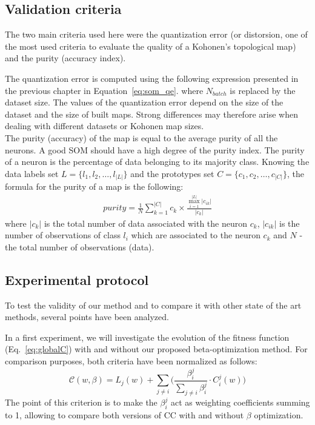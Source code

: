 \subsection{Validation criteria}
The two main criteria used here were the quantization error (or distorsion, one of the most used criteria to evaluate the quality of a Kohonen's topological map) and the purity (accuracy index).

The quantization error is computed using the following expression presented in the previous chapter in Equation~\ref{eq:som_qe}.
where $N_{batch}$ is replaced by the dataset size. The values of the quantization error depend on the size of the dataset and the size of built maps. Strong differences may therefore arise when dealing with different datasets or Kohonen map sizes.\\

The purity (accuracy) of the map is equal to the average purity of all the neurons.
A good SOM should have a high degree of the purity index.
The purity of a neuron is the percentage of data belonging to its majority class.
Knowing the data labels set $L = \{l_{1}, l_{2}, \ldots,  l_{|L|}\}$ and the prototypes set
$C = \{c_{1}, c_{2}, \ldots, c_{|C|}\}$, the formula for the purity of a map is the following:\\

\begin{eqnarray}
purity = \frac{1}{N} \sum_{k=1}^{|C|} c_{k}\times \frac{\max_{i=1}^{|L|}|c_{ik}|}{|c_{k}|}
\end{eqnarray}
where $|c_k|$ is the total number of data associated with the neuron $c_k$, $|c_{ik}| $ is the number of observations
of class $l_{i}$ which are associated to the neuron $c_{k}$ and $N$ - the total number of observations (data).\\%



\subsection{Experimental protocol}
To test the validity of our method and to compare it with other state of the art methods, several points have been analyzed. 

In a first experiment, we will investigate the evolution of the fitness function (Eq.~\ref{eq:globalC}) with and without our proposed beta-optimization method. For comparison purposes, both criteria have been normalized as follows: 
\begin{equation}
\mathcal{C}(w,\beta) = L_j(w) +
\sum_{j \neq i} \Big(\frac{\beta^j_i}{\sum_{j \neq i}\beta^j_i} \cdot C^j_i(w)\Big)	
\label{eq:globalC2}
\end{equation}
The point of this criterion is to make the $\beta^j_i$ act as weighting coefficients summing to 1, allowing to compare both versions of CC with and without $\beta$ optimization. \\

